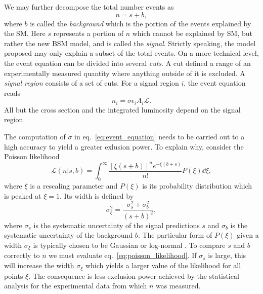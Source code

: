 We may further decompose the total number events as
\begin{equation}\label{eq:total_events_decomp}
    n = s + b,
\end{equation}
where $b$ is called the \textit{background} which is the portion of the events explained by the SM. Here $s$ represents a portion of $n$ which cannot be explained by SM, but rather the new BSM model, and is called the \textit{signal}. Strictly speaking, the model proposed may only explain a subset of the total events. 
On a more technical level, the event equation can be divided into several \textit{cuts}. A cut defined a range of an experimentally measured quantity where anything outside of it is excluded. A \textit{signal region} consists of a set of cuts. For a signal region $i$, the event equation reads
\begin{equation}\label{eq:general_event_eq}
    n_i = \sigma \epsilon_i A_i \mathcal{L}.
\end{equation} 
All but the cross section and the integrated luminosity depend on the signal region.

The computation of $\sigma$ in eq.~\eqref{eq:event_equation} needs to be carried out to a high accuracy to yield a greater exlusion power. To explain why, consider the Poisson likelihood
\begin{equation}\label{eq:poisson_likelihood}
    \mathcal{L}(n|s, b) = \int_0^\infty \frac{[\xi(s + b)]^n e^{-\xi(b + s)}}{n!}P(\xi)\dd \xi,
\end{equation}
where $\xi$ is a rescaling parameter and $P(\xi)$ is its probability distribution which is peaked at $\xi = 1$.
Its width is defined by
\begin{equation}\label{eq:xi_width}
    \sigma_\xi^2 = \frac{\sigma_s^2 + \sigma_b^2}{(s + b)^2},
\end{equation}
where $\sigma_s$ is the systematic uncertainty of the signal predictions $s$ and $\sigma_b$ is the systematic uncertainty of the background $b$. The particular form of $P(\xi)$ given a width $\sigma_\xi$ is typically chosen to be Gaussian or log-normal \cite{colliderbit}.
To compare $s$ and $b$ correctly to $n$ we must evaluate eq.~\eqref{eq:poisson_likelihood}. If $\sigma_s$ is large, this will increase the width $\sigma_\xi$ which yields a larger value of the likelihood for all points $\xi$. The consequence is less exclusion power achieved by the statistical analysis for the experimental data from which $n$ was measured.

